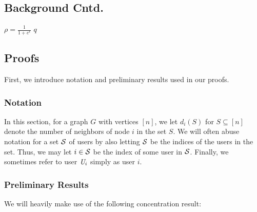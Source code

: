 \graphicspath{{./chapters/chapter4/}}
\chapter{ }

\section{Background Cntd.}\label{chap4-app:background}


\setlength{\textfloatsep}{2pt}
%  
\begin{algorithm}
  $\rho=\frac{1}{1+e^{\epsilon}}$\;
  \KwRet $q$
  \caption{$\rr_\rho: \{0,1\}^n\mapsto\{0,1\}^n$ }\label{chap4-alg:rr}
\end{algorithm}

\section{Proofs}\label{chap4-app:proofs}
First, we introduce notation and preliminary results used in our proofs.
\subsection{Notation} In this section, for a graph $G$ with vertices $[n]$, we let $d_i(S)$ for $S \subseteq [n]$ denote the number of neighbors of node $i$ in the set $S$.
We will often abuse notation for a set $\mathcal{S}$ of users by also letting $\mathcal{S}$ be the indices of the users in the set. Thus, we may let $i \in \mathcal{S}$ be the index of some user in $\mathcal{S}$.
Finally, we sometimes refer to user $\textit{U}_i$ simply as user $i$.

\subsection{Preliminary Results}
We will heavily make use of the following concentration result:

